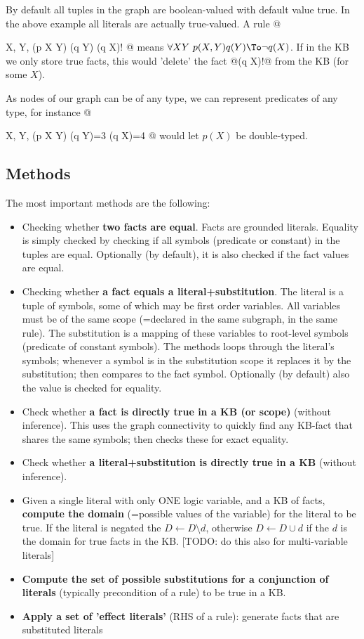 \documentclass[10pt,fleqn,twoside]{article}
\begin{document}
By default all tuples in the graph are boolean-valued with default
value true. In the above example all literals are actually
true-valued. A rule @{X, Y, { (p X Y) (q Y) } { (q X)! }@
means $\forall X Y~ p(X, Y) q(Y) \To \neg q(X)$. If in the KB we only
store true facts, this would 'delete' the fact @(q X)!@ from the KB
(for some $X$).

As nodes of our graph can be of any type, we can represent predicates
of any type, for instance @{X, Y, { (p X Y) (q Y)=3 } { (q X)=4 }@
would let $p(X)$ be double-typed.


\subsection{Methods}

The most important methods are the following:
\begin{itemize}
\item Checking whether \textbf{two facts are equal}. Facts are
  grounded literals. Equality is simply checked by checking if all
  symbols (predicate or constant) in the tuples are equal. Optionally
  (by default), it is also checked if the fact values are equal.
\item Checking whether \textbf{a fact equals a
  literal+substitution}. The literal is a tuple of symbols, some of
  which may be first order variables. All variables must be of the
  same scope (=declared in the same subgraph, in the same rule). The
  substitution is a mapping of these variables to root-level symbols
  (predicate of constant symbols). The methods loops through the
  literal's symbols; whenever a symbol is in the substitution scope it
  replaces it by the substitution; then compares to the fact
  symbol. Optionally (by default) also the value is checked for equality.
\item Check whether \textbf{a fact is directly true in a KB (or
  scope)} (without inference). This uses the graph connectivity to
  quickly find any KB-fact that shares the same symbols; then checks
  these for exact equality.
\item Check whether \textbf{a literal+substitution is directly true in
  a KB} (without inference).
\item Given a single literal with only ONE logic variable, and a KB of facts,
  \textbf{compute the domain} (=possible values of the variable) for the
  literal to be true. If the literal is negated the $D \gets
  D\setminus d$, otherwise $D \gets D \cup d$ if the $d$ is the domain
  for true facts in the KB. [TODO: do this also for multi-variable literals]
\item \textbf{Compute the set of possible substitutions for a
  conjunction of literals} (typically precondition of a rule) to be
  true in a KB.
\item \textbf{Apply a set of 'effect literals'} (RHS of a rule): generate facts
  that are substituted literals
\end{itemize}

}}
\end{document}
